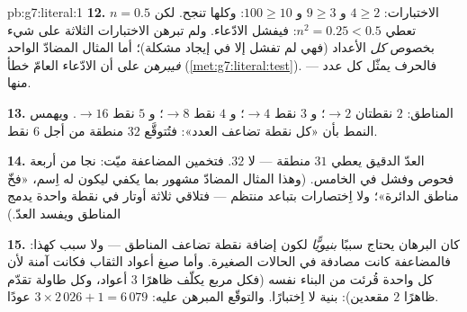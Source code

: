 \begin{solution}{pb:g7:literal:1}
\textbf{12.} الاختبارات: $4 \geq 2$ و $9 \geq 3$ و $100 \geq 10$: وكلها
تنجح. لكن $n = 0.5$ تعطي $n^2 = 0.25 < 0.5$: فيفشل الادّعاء.
ولم تبرهن الاختبارات الثلاثة على شيء بخصوص \emph{كل} الأعداد (فهي
لم تفشل إلا في إيجاد مشكلة)؛ أما المثال المضادّ الواحد
\emph{فيبرهن} على أن الادّعاء العامّ خطأ
(\cref{met:g7:literal:test}). فالحرف يمثّل كل عدد
---  منها.

\textbf{13.} المناطق: $2$ نقطتان $\to 2$؛ و $3$ نقط $\to 4$؛
و $4$ نقط $\to 8$؛ و $5$ نقط $\to 16$. ويهمس النمط
بأن «كل نقطة تضاعف العدد»: فتُتوقَّع $32$ منطقة من أجل
$6$ نقط.

\textbf{14.} العدّ الدقيق يعطي $31$ منطقة --- لا $32$.
فتخمين المضاعفة ميّت: نجا من أربعة فحوص
وفشل في الخامس. (وهذا المثال المضادّ مشهور بما يكفي ليكون له
اِسم، «فخّ مناطق الدائرة»؛ ولا اِختصارات بتباعد منتظم
--- فتلاقي ثلاثة أوتار في نقطة واحدة يدمج المناطق ويفسد العدّ.)

\textbf{15.} كان البرهان يحتاج سببًا \emph{بنيويًّا}
لكون إضافة نقطة تضاعف المناطق --- ولا سبب
كهذا: فالمضاعفة كانت مصادفة في الحالات الصغيرة.
وأما صيغ أعواد الثقاب فكانت آمنة لأن كل واحدة قُرئت من
البناء نفسه (فكل مربع يكلّف ظاهرًا $3$ أعواد،
وكل طاولة تقدّم ظاهرًا $2$ مقعدين): بنية لا اِختبارًا.
والتوقّع المبرهن عليه: $3 \times 2\,026 + 1 = 6\,079$ عودًا.
\end{solution}
